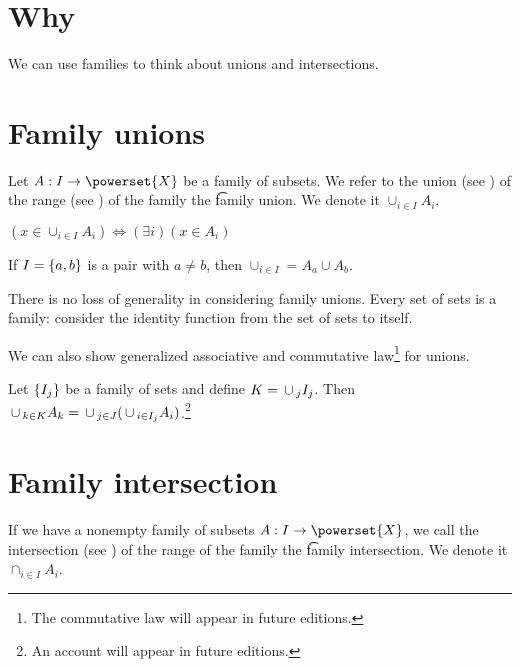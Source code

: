 

\section*{Why}

We can use families to think about unions and intersections.

\section*{Family unions}

Let $A: I \to \powerset{X}$ be a family of subsets.
We refer to the union (see ) of the range (see ) of the family the \t{family union}.
We denote it $\cup_{i \in I} A_i$.

\begin{proposition}
$(x \in \cup_{i \in I} A_i) \iff (\exists i)(x \in A_i)$
\end{proposition}

If $I = \{a, b\}$ is a pair with $a \neq b$, then $\cup_{i \in I} = A_a \cup A_b$.

There is no loss of generality in considering family unions.
Every set of sets is a family: consider the identity function from the set of sets to itself.

We can also show generalized associative and commutative law\footnote{The commutative law will appear in future editions.}
for unions.

\begin{proposition}
Let $\{I_j\}$ be a family of sets and define $K = \,\cup\,_{j} I_j$. Then $\,\cup\,_{k \in K} A_k = \,\cup\,_{j \in J}(\,\cup\,_{i \in I_j} A_i)$.\footnote{An account will appear in future editions.}
\end{proposition}

\section*{Family intersection}

If we have a nonempty family of subsets $A: I \to \powerset{X}$, we call the intersection (see ) of the range of the family the \t{family intersection}.
We denote it $\cap _{i \in I} A_i$.

